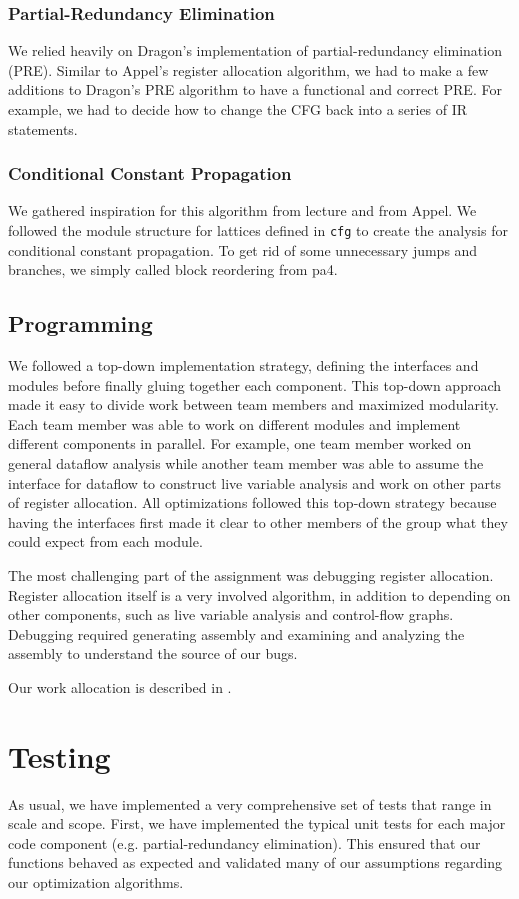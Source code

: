 \documentclass{hw}
\begin{document}
\subsubsection{Partial-Redundancy Elimination}
We relied heavily on Dragon's implementation of partial-redundancy elimination (PRE). Similar to Appel's register allocation algorithm, we had to make a few additions to Dragon's PRE algorithm to have a functional and correct PRE. For example, we had to decide how to change the CFG back into a series of IR statements.

\subsubsection{Conditional Constant Propagation}
We gathered inspiration for this algorithm from lecture and from Appel. We followed the module structure for lattices defined in \texttt{cfg} to create the analysis for conditional constant propagation. To get rid of some unnecessary jumps and branches, we simply called block reordering from pa4.


\subsection{Programming}
We followed a top-down implementation strategy, defining the interfaces and modules before finally gluing together each
component. This top-down approach made it easy to
divide work between team members and maximized modularity. Each team member was able to work on different modules and implement different components in parallel. For example, one team member worked on general dataflow analysis while another team member was able to assume the interface for dataflow to construct live variable analysis and work on other parts of register allocation. All optimizations followed this top-down strategy because having the interfaces first made it clear to other members of the group what they could expect from each module.

The most challenging part of the assignment was debugging register allocation. Register allocation itself is a very involved algorithm, in addition to depending on other components, such as live variable analysis and control-flow graphs. Debugging required generating assembly and examining and analyzing the assembly to understand the source of our bugs.

Our work allocation is described in .

\section{Testing}\label{sec:testing}
As usual, we have implemented a very comprehensive set of tests that range in
scale and scope. First, we have implemented the typical unit tests for each major
code component (e.g. partial-redundancy elimination). This ensured that our functions behaved as
expected and validated many of our assumptions regarding our optimization algorithms.
\end{document}
